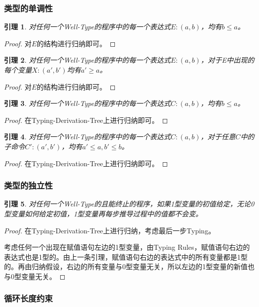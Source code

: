 \documentclass{ctexart}
\newtheorem{lemma}{引理}
\newtheorem{proof}{证明}
\begin{document}
\subsubsection{类型的单调性}
\begin{lemma}
对任何一个Well-Type的程序中的每一个表达式$E:(a,b)$，均有$b\leqslant a$。
\end{lemma}
\begin{proof}
对$E$的结构进行归纳即可。
\end{proof}
\begin{lemma}
对任何一个Well-Type的程序中的每一个表达式$E:(a,b)$，对于E中出现的每个变量$X:(a',b')$均有$a'\geqslant a$。
\end{lemma}
\begin{proof}
对$E$的结构进行归纳即可。
\end{proof}
\begin{lemma}
对任何一个Well-Type的程序中的每一个表达式$C:(a,b)$，均有$b\leqslant a$。
\end{lemma}
\begin{proof}
在Typing-Derivation-Tree上进行归纳即可。
\end{proof}
\begin{lemma}
对任何一个Well-Type的程序中的每一个表达式$C:(a,b)$，对于任意$C$中的子命令$C':(a',b')$，均有$a'\leqslant a, b'\leqslant b$。
\end{lemma}
\begin{proof}
在Typing-Derivation-Tree上进行归纳即可。
\end{proof}
\subsubsection{类型的独立性}
\begin{lemma}
对任何一个Well-Type的且能终止的程序，如果1型变量的初值给定，无论0型变量如何给定初值，1型变量再每步推导过程中的值都不会变。
\end{lemma}
\begin{proof}
在Typing-Derivation-Tree上进行归纳，考虑最后一步Typing。

考虑任何一个出现在赋值语句左边的1型变量，由Typing Rules，赋值语句右边的表达式也是1型的。由上一条引理，赋值语句右边的表达式中的所有变量都是1型的。再由归纳假设，右边的所有变量与0型变量无关，所以左边的1型变量的新值也与0型变量无关。
\end{proof}
\subsubsection{循环长度约束}
\end{document}
